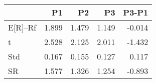 \begin{tabular}{lrrrr}
\toprule
 & P1 & P2 & P3 & P3-P1 \\
\midrule
E[R]--Rf & 1.899 & 1.479 & 1.149 & -0.014 \\
t & 2.528 & 2.125 & 2.011 & -1.432 \\
Std & 0.167 & 0.155 & 0.127 & 0.117 \\
SR & 1.577 & 1.326 & 1.254 & -0.893 \\
\bottomrule
\end{tabular}
